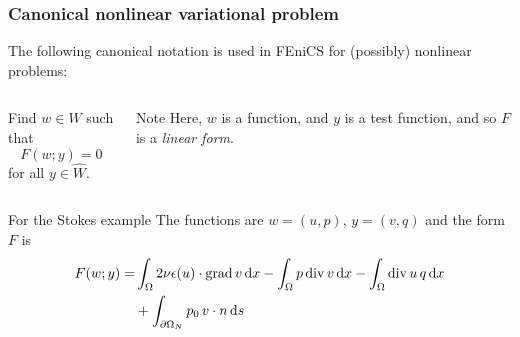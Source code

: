\begin{frame}%
  \frametitle{Canonical nonlinear variational problem}
  \bigskip

  The following canonical notation is used in FEniCS for (possibly)
  nonlinear problems:

  \bigskip

  \begin{columns}[t]
    \begin{column}{0.4\textwidth}
      Find $w \in W$ such that
      \begin{equation*}
        F(w; y) = 0
      \end{equation*}
      for all $y \in \hat{W}$.
    \end{column}
    \begin{column}{0.4\textwidth}
      \vspace{-2em}
      {\small
      \begin{block}{Note}
        Here, $w$ is a function, and $y$ is a test function, and so $F$ is
        a \emph{linear form}.
      \end{block}
      }
    \end{column}
  \end{columns}

  \bigskip
  \begin{block}{For the Stokes example}
  The functions are $w = (u, p)$, $y = (v, q)$ and the form $F$ is
  \begin{equation*}
    \begin{split}
    F(w; y) =
    &\int_{\Omega} 2\nu \epsilon(u) \cdot \operatorname{\mathrm{grad}} v \, \mathrm{d}x
    - \int_{\Omega} p \operatorname{\mathrm{div}} v \, \mathrm{d}x
    - \int_{\Omega} \operatorname{\mathrm{div}} u \, q \, \mathrm{d}x \\
    &+ \int_{\partial \Omega_N} p_0 \, v \cdot n \, \mathrm{d}s
    \end{split}
  \end{equation*}
  \end{block}
\end{frame}

